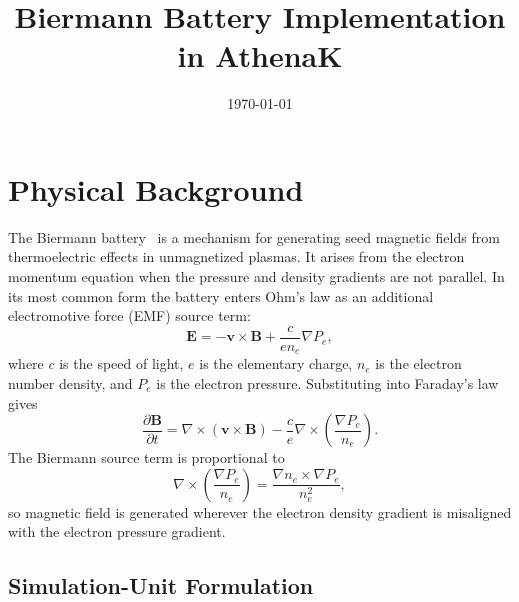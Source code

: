 \documentclass[11pt]{article}
\title{Biermann Battery Implementation in AthenaK}
\author{}
\date{\today}
\newcommand{\bv}[1]{\boldsymbol{#1}}
\newcommand{\grad}{\nabla}
\newcommand{\curl}{\nabla \times}
\begin{document}
\maketitle

\tableofcontents
\newpage

\section{Physical Background}
\label{sec:physics}

The Biermann battery~\cite{biermann1950} is a mechanism for generating seed
magnetic fields from thermoelectric effects in unmagnetized plasmas.  It arises
from the electron momentum equation when the pressure and density gradients are
not parallel.  In its most common form the battery enters Ohm's law as an
additional electromotive force (EMF) source term:
\begin{equation}
  \bv{E} = -\bv{v}\times\bv{B}
          + \frac{c}{e n_e}\grad P_e,
  \label{eq:ohm_full}
\end{equation}
where $c$ is the speed of light, $e$ is the elementary charge,
$n_e$ is the electron number density, and $P_e$ is the electron pressure.
Substituting into Faraday's law gives
\begin{equation}
  \frac{\partial\bv{B}}{\partial t}
    = \curl(\bv{v}\times\bv{B})
    - \frac{c}{e}\curl\!\left(\frac{\grad P_e}{n_e}\right).
  \label{eq:induction_batt}
\end{equation}
The Biermann source term is proportional to
\begin{equation}
  \curl\!\left(\frac{\grad P_e}{n_e}\right)
    = \frac{\grad n_e \times \grad P_e}{n_e^2},
\end{equation}
so magnetic field is generated wherever the electron density gradient is
misaligned with the electron pressure gradient.

\subsection{Simulation-Unit Formulation}
\label{sec:sim_units}
\end{document}
